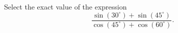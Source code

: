 \documentclass{ximera}
\author{Ivo Terek}
\begin{document}
\begin{exercise}

Select the exact value of the expression $$\frac{\sin(30^\circ) + \sin(45^\circ)}{\cos(45^\circ) + \cos(60^\circ)}.$$
\begin{multipleChoice}
\end{multipleChoice}


\end{exercise}
\end{document}
